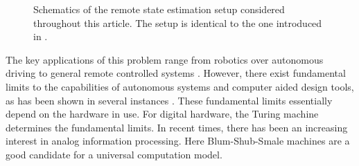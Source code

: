 \documentclass[conference]{IEEEtran}
\newcommand{\rys}{(\mathsf{y}_t)_{t\in\NN}}
\newcommand{\rvs}{(\mathsf{v}_t)_{t\in\NN}}
\newcommand{\rshs}{(\hat{\mathsf{s}}_t)_{t\in\NN}}
\def\D{{\mathcal D}}
\def\NN{{\mathbb N}}
\newcommand{\De}{\D_{\text{Est}}}
\newcommand{\Dc}{\D_{\text{Ctrl}}}
\newcommand{\tbr}[1]{}
\begin{document}
\begin{figure}
		\caption{Schematics of the remote state estimation setup considered throughout this article. The setup is identical to the one introduced in \cite{BoBoDe21TAC}\tbr{{\color{red}\(\leftarrow\) Change to TAC!~}}.}
		\label{fig:Schematics}
	\end{figure}
	The key applications of this problem range from robotics over autonomous driving to general remote controlled systems \cite{FeBo21}. However, there exist fundamental 
	limits to the capabilities of autonomous systems and computer aided design tools, as has been shown in several instances \cite{BoBoDe21TAC}\tbr{{\color{red}\(\leftarrow\) Check this source!~}}. These fundamental limits essentially
	depend on the hardware in use. For digital hardware, the Turing machine determines the fundamental limits. In recent times, there has been an increasing interest in analog information processing.
	Here Blum-Shub-Smale machines are a good candidate for a universal computation model.
	
\end{document}
